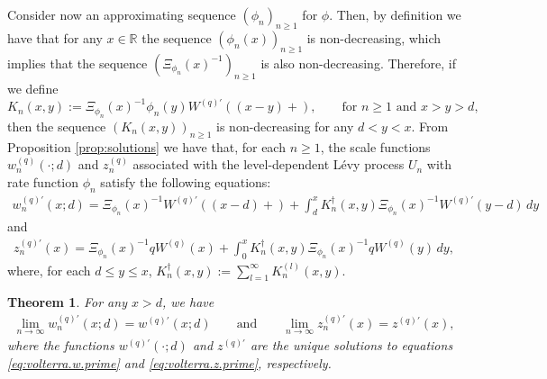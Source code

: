 \documentclass[12pt,reqno]{amsart}
\newcommand{\red}{\textcolor[rgb]{1.00,0.00,0.00}}
\newcommand{\blue}{\textcolor[rgb]{0.00,0.00,1.00}}
\newtheorem{theorem}{Theorem}
\theoremstyle{definition}
\theoremstyle{remark}
\begin{document}
\medskip
Consider now an approximating sequence $(\phi_n)_{n\geq 1}$ for $\phi$. Then, by definition we have that for any $x\in\mathbb{R}$ the sequence $(\phi_n(x))_{n\geq1}$ is non-decreasing, which implies that the sequence
$(\Xi_{\phi_n}(x)^{-1})_{n\geq1}$ is also non-decreasing. Therefore, if we define
\[
K_n(x,y):=\Xi_{\phi_n}(x)^{-1}\phi_n(y)W^{(q)\prime}((x-y)+),\qquad\text{for $n\geq 1$ and $x> y> d$,}
\] 
then the sequence $(K_n(x,y))_{n\geq1}$ is non-decreasing for any $d< y< x$. 
From Proposition \ref{prop:solutions} we have that, for each $n\geq1$, the scale functions $w^{(q)}_n(\cdot;d)$ and $z^{(q)}_n$ associated with the level-dependent L\'evy process $U_n$ 
with rate function $\phi_n$ satisfy the following equations: 
\begin{align}\label{approx_sf}
 w_n^{(q)\prime}(x;d)= \Xi_{\phi_n}(x)^{-1}  W^{(q)\prime}((x-d)+)+\int_d^xK^{\dagger}_{n}(x,y) \Xi_{\phi_n}(x)^{-1}{W^{(q)\prime}}(y-d) \,dy
 \end{align}
and
\begin{align*}
 z_n^{(q)\prime}(x)=\Xi_{\phi_n}(x)^{-1} qW^{(q)}(x)+\int_0^xK^{\dagger}_{n}(x,y) \Xi_{\phi_n}(x)^{-1} qW^{(q)}(y)\,dy,
\end{align*}
where, for each $d\leq y\leq x$, $K^{\dagger}_{n}(x,y):=\sum_{l=1}^{\infty} K^{(l)}_n(x,y)$.


\begin{theorem}\label{conv_sf} For any $x > d$, we have
\begin{align*}
\lim_{n\to\infty}w_n^{(q)\prime}(x;d)=w^{(q)\prime}(x;d)\qquad\text{and}\qquad 
\lim_{n\to\infty}z_n^{(q)\prime}(x)=z^{(q)\prime}(x),
\end{align*}
where the functions $w^{(q)\prime}(\cdot;d)$ and $z^{(q)\prime}$ are the unique solutions to equations \eqref{eq:volterra.w.prime} and \eqref{eq:volterra.z.prime}, respectively.
\end{theorem}
\end{document}
